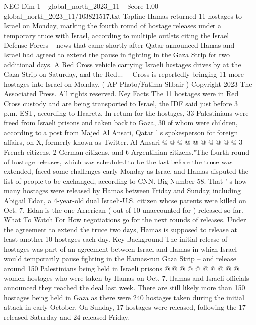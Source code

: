 \begin{textsample}{NEG Dim 1 – global\_north\_2023\_11 – Score 1.00 – global\_north\_2023\_11/103821517.txt}  \label{ex:f1_neg_193}
Topline Hamas returned 11 hostages to Israel on Monday, marking the fourth round of hostage releases under a temporary truce with Israel, according to multiple outlets citing the Israel Defense Forces -- news that came shortly after Qatar announced Hamas and Israel had agreed to extend the pause in fighting in the Gaza Strip for two additional days.
A Red Cross vehicle carrying Israeli hostages drives by at the Gaza Strip on Saturday, and the Red... + Cross is reportedly bringing 11 more hostages into Israel on Monday. ( AP Photo/Fatima Shbair ) Copyright 2023 The Associated Press.
All rights reserved.
Key Facts The 11 hostages were in Red Cross custody and are being transported to Israel, the IDF said just before 3 p.m.
EST, according to Haaretz.
In return for the hostages, 33 Palestinians were freed from Israeli prisons and taken back to Gaza, 30 of whom were children, according to a post from Majed Al Ansari, Qatar ' s spokesperson for foreign affairs, on X, formerly known as Twitter.
Al Ansari @ @ @ @ @ @ @ @ @ @ 3 French citizens, 2 German citizens, and 6 Argentinian citizens."The fourth round of hostage releases, which was scheduled to be the last before the truce was extended, faced some challenges early Monday as Israel and Hamas disputed the list of people to be exchanged, according to CNN.
Big Number 58.
That ' s how many hostages were released by Hamas between Friday and Sunday, including Abigail Edan, a 4-year-old dual Israeli-U.S. citizen whose parents were killed on Oct. 7.
Edan is the one American ( out of 10 unaccounted for ) released so far.
What To Watch For How negotiations go for the next rounds of releases.
Under the agreement to extend the truce two days, Hamas is supposed to release at least another 10 hostages each day.
Key Background The initial release of hostages was part of an agreement between Israel and Hamas in which Israel would temporarily pause fighting in the Hamas-run Gaza Strip -- and release around 150 Palestinians being held in Israeli prisons @ @ @ @ @ @ @ @ @ @ women hostages who were taken by Hamas on Oct. 7.
Hamas and Israeli officials announced they reached the deal last week.
There are still likely more than 150 hostages being held in Gaza as there were 240 hostages taken during the initial attack in early October.
On Sunday, 17 hostages were released, following the 17 released Saturday and 24 released Friday.

\end{textsample}
